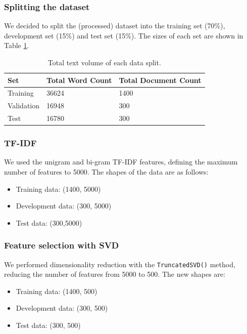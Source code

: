 \documentclass[10pt, a4paper]{article}
\begin{document}
    \subsubsection{Splitting the dataset}
    We decided to split the (processed) dataset into the training set (70\%), development set (15\%) and test set (15\%). The sizes of each set are shown in Table \ref{tab::ex-9-stats}.

    \begin{table}
		\begin{tabular}{|l|l|l|}
			\hline
			\cellcolor{blue!25}\textbf{Set} & \cellcolor{blue!25}\textbf{Total Word Count} &
			\cellcolor{blue!25}\textbf{Total Document Count}\\
			\hline
			Training & 36624 & 1400 \\\hline
			Validation & 16948  & 300 \\\hline
			Test & 16780 & 300 \\\hline
		\end{tabular}
		\centering
		\caption{Total text volume of each data split.}
		\label{tab::ex-9-stats}
	\end{table}
    

    \subsubsection{TF-IDF}
    We used the unigram and bi-gram TF-IDF features, defining the maximum number of features to 5000. The shapes of the data are as follows:

    
    \begin{itemize}
        \item Training data: (1400, 5000)
        \item Development data: (300, 5000)
        \item Test data: (300,5000)
    \end{itemize}

    \subsubsection{Feature selection with SVD}
    We performed dimensionality reduction with the \texttt{TruncatedSVD()} method, reducing the number of features from 5000 to 500. The new shapes are:

    
    \begin{itemize}
        \item Training data: (1400, 500)
        \item Development data: (300, 500)
        \item Test data: (300, 500)
    \end{itemize}
\end{document}
